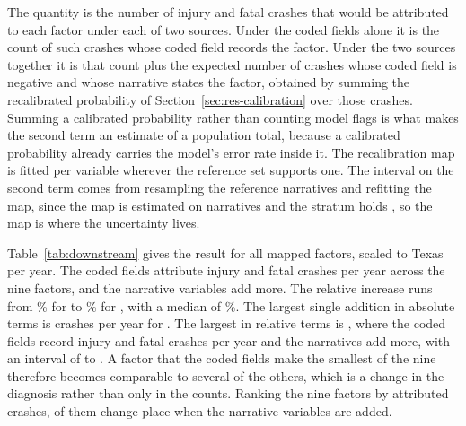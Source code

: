 The quantity is the number of injury and fatal crashes that would be attributed to each factor
under each of two sources. Under the coded fields alone it is the count of such crashes whose
coded field records the factor. Under the two sources together it is that count plus the
expected number of crashes whose coded field is negative and whose narrative states the factor,
obtained by summing the recalibrated probability of Section~\ref{sec:res-calibration} over
those crashes. Summing a calibrated probability rather than counting model flags is what makes
the second term an estimate of a population total, because a calibrated probability already
carries the model's error rate inside it. The recalibration map is fitted per variable wherever
the reference set supports one. The interval on the second term comes from resampling
the reference narratives and refitting the map, since the map is estimated on
\GoldNNarratives{} narratives and the stratum holds \NstageTwoRandom{}, so the map is where the
uncertainty lives.

Table~\ref{tab:downstream} gives the result for all \DownNVars{} mapped factors, scaled to
Texas per year. The coded fields attribute \DownCodedTotal{} injury and fatal crashes per year
across the nine factors, and the narrative variables add \DownAddedTotal{} more. The relative
increase runs from \DownRelMin\% for \DownRelMinVar{} to \DownRelMax\% for \DownRelMaxVar{},
with a median of \DownRelMedian\%. The largest single addition in absolute terms is
\DownAddedMax{} crashes per year for \DownAddedMaxVar{}. The largest in relative terms is
\DownRelMaxVar{}, where the coded fields record \DownTopCoded{} injury and fatal crashes per
year and the narratives add \DownTopAdded{} more, with an interval of \DownTopAddedLo{} to
\DownTopAddedHi{}. A factor that the coded fields make the smallest of the nine therefore
becomes comparable to several of the others, which is a change in the diagnosis rather than
only in the counts. Ranking the nine factors by attributed crashes, \DownNRankMove{} of them
change place when the narrative variables are added.

